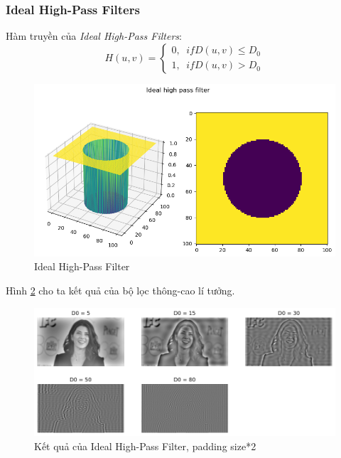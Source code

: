 \documentclass{article}
\begin{document}
        \subsubsection{Ideal High-Pass Filters}
        Hàm truyền của \textit{Ideal High-Pass Filters}:
        $$
        H(u,v) = \begin{cases}
            0, \phantom{a}if D(u,v) \leq D_0\\
            1,\phantom{a} if D(u,v) > D_0
        \end{cases}
        $$
        \begin{figure}[ht!]
        \centering
        \includegraphics[width = \linewidth]{fo18.png}
        \caption{Ideal High-Pass Filter}
        \label{fig19}
        \end{figure}
        Hình \ref{fig20} cho ta kết quả của bộ lọc thông-cao lí tưởng.
         \begin{figure}[ht!]
        \centering
        \includegraphics[width = \linewidth]{fo19.png}
        \caption{Kết quả của Ideal High-Pass Filter, padding size*2}
        \label{fig20}
        \end{figure}

        \newpage
\end{document}
